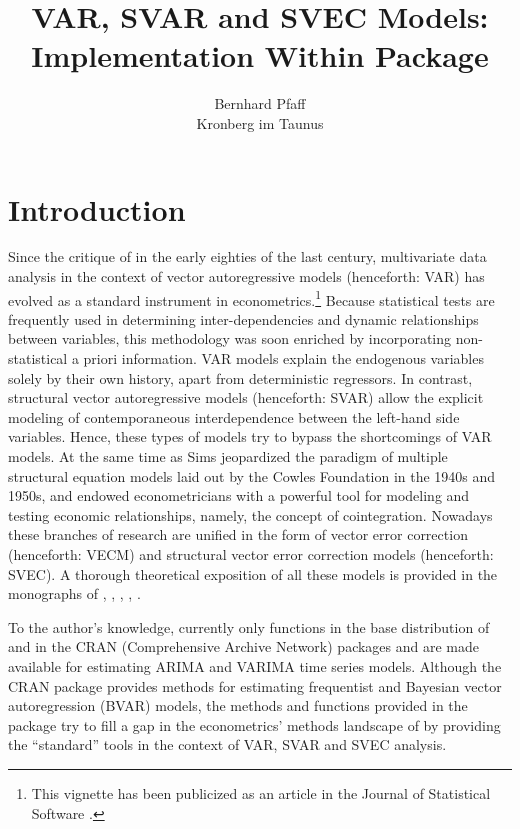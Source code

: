 \documentclass[nojss]{jss}
\title{VAR, SVAR and SVEC Models: Implementation Within \proglang{R}
  Package \pkg{vars}}
\author{Bernhard Pfaff\\Kronberg im Taunus}
\begin{document}


\section{Introduction}
\label{sec:intro}

Since the critique of \cite{SIM1980} in the early eighties of the last
century, multivariate data analysis in the context of vector
autoregressive models (henceforth: VAR) has evolved as a standard
instrument in econometrics.\footnote{This vignette has been publicized
  as an article in the Journal of Statistical Software
  \citep[see][]{vars}.} Because statistical tests are frequently used
in determining inter-dependencies and dynamic relationships between
variables, this methodology was soon enriched by incorporating
non-statistical a priori information. VAR models explain the
endogenous variables solely by their own history, apart from
deterministic regressors. In contrast, structural vector
autoregressive models (henceforth: SVAR) allow the explicit modeling
of contemporaneous interdependence between the left-hand side
variables. Hence, these types of models try to bypass the shortcomings
of VAR models. At the same time as Sims jeopardized the paradigm of
multiple structural equation models laid out by the Cowles Foundation
in the 1940s and 1950s, \citet{GRA1981} and
\citet{ENG1987} endowed econometricians with a powerful tool for
modeling and testing economic relationships, namely, the concept of
cointegration. Nowadays these branches of research are unified in the
form of vector error correction (henceforth: VECM) and structural
vector error correction models (henceforth: SVEC). A thorough
theoretical exposition of all these models is provided in the
monographs of \cite{LUE2006}, \cite{HEN1995}, \cite{JOH1995},
\cite{HAM1994}, \cite{BAN1993}.

To the author's knowledge, currently only functions in the base
distribution of  and in the CRAN (Comprehensive  Archive Network) packages 
\citep{dse1, dse2, dse3} and  \citep{fArma}
are made available for estimating ARIMA and VARIMA time series
models. Although the CRAN package  \citep{MSBVAR}
provides methods for estimating frequentist and Bayesian vector
autoregression (BVAR) models, the methods and functions provided in
the package  try to fill a gap in the econometrics' methods
landscape of  by providing the ``standard'' tools in the
context of VAR, SVAR and SVEC analysis.
\end{document}
